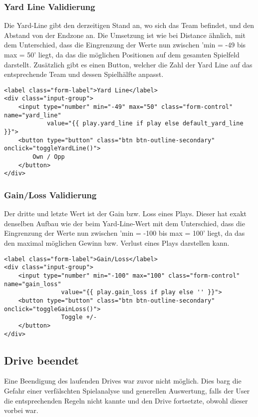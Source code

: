 \subsubsection{Yard Line Validierung}
\noindent
Die Yard-Line gibt den derzeitigen Stand an, wo sich das Team befindet, und den Abstand von der Endzone an. Die Umsetzung ist wie bei Distance ähnlich, mit dem Unterschied, dass die Eingrenzung der Werte nun zwischen 'min = -49 bis max = 50' liegt, da das die möglichen Positionen auf dem gesamten Spielfeld darstellt. Zusätzlich gibt es einen Button, welcher die Zahl der Yard Line auf das entsprechende Team und dessen Spielhälfte anpasst.
\begin{verbatim}
<label class="form-label">Yard Line</label>
<div class="input-group">
    <input type="number" min="-49" max="50" class="form-control" name="yard_line"
            value="{{ play.yard_line if play else default_yard_line }}">
    <button type="button" class="btn btn-outline-secondary" onclick="toggleYardLine()">
        Own / Opp
    </button>
</div>
\end{verbatim}
\subsubsection{Gain/Loss Validierung}
\noindent
Der dritte und letzte Wert ist der Gain bzw. Loss eines Plays. Dieser hat exakt denselben Aufbau wie der beim Yard-Line-Wert mit dem Unterschied, dass die Eingrenzung der Werte nun zwischen 'min = -100 bis max = 100' liegt, da das den maximal möglichen Gewinn bzw. Verlust eines Plays darstellen kann. 
\begin{verbatim}
<label class="form-label">Gain/Loss</label>
<div class="input-group">
    <input type="number" min="-100" max="100" class="form-control" name="gain_loss"
                value="{{ play.gain_loss if play else '' }}">
    <button type="button" class="btn btn-outline-secondary" onclick="toggleGainLoss()">
                Toggle +/-
    </button>
</div>
\end{verbatim}
\subsection{Drive beendet}
Eine Beendigung des laufenden Drives war zuvor nicht möglich. Dies barg die Gefahr einer verfälschten Spielanalyse und generellen Auswertung, falls der User die entsprechenden Regeln nicht kannte und den Drive fortsetzte, obwohl dieser vorbei war.
